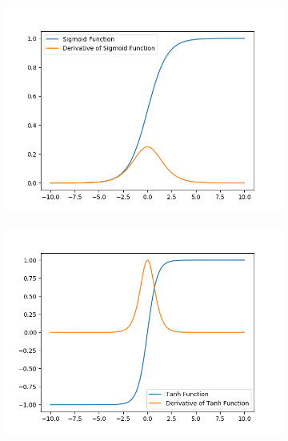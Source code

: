 \begin{figure}[h]
    \centering
    \begin{subfigure}[b]{0.49\textwidth}
        \includegraphics[width=\textwidth]{figures/sigmoid.png}
        \label{fig:Sigmoid}
    \end{subfigure}
    \begin{subfigure}[b]{0.49\textwidth}
        \includegraphics[width=\textwidth]{figures/tanh.png}
        \label{fig:Tanh}
    \end{subfigure}
    \begin{subfigure}[b]{0.49\textwidth}

\end{subfigure}
\end{figure}

